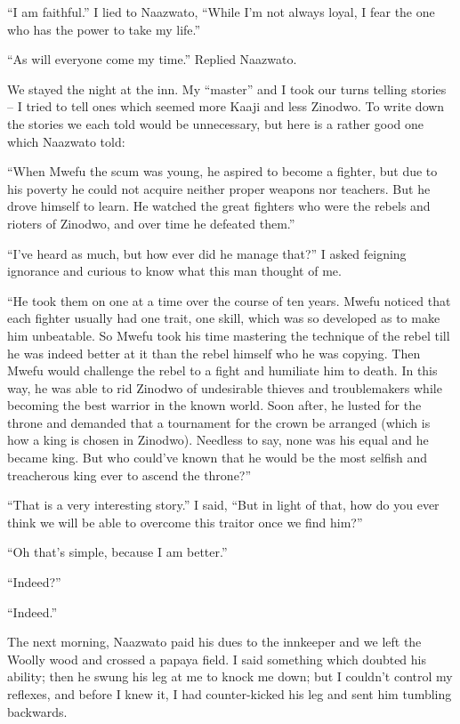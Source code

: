 ``I am faithful.'' I lied to Naazwato, ``While I'm not always loyal, I fear the one who has the power to take my life.''

``As will everyone come my time.'' Replied Naazwato.

We stayed the night at the inn. My ``master'' and I took our turns telling stories -- I tried to tell ones which seemed more Kaaji and less Zinodwo. To write down the stories we each told would be unnecessary, but here is a rather good one which Naazwato told:

``When Mwefu the scum was young, he aspired to become a fighter, but due to his poverty he could not acquire neither proper weapons nor teachers. But he drove himself to learn. He watched the great fighters who were the rebels and rioters of Zinodwo, and over time he defeated them.''

``I've heard as much, but how ever did he manage that?'' I asked feigning ignorance and curious to know what this man thought of me.

``He took them on one at a time over the course of ten years. Mwefu noticed that each fighter usually had one trait, one skill, which was so developed as to make him unbeatable. So Mwefu took his time mastering the technique of the rebel till he was indeed better at it than the rebel himself who he was copying.
Then Mwefu would challenge the rebel to a fight and humiliate him to death. In this way, he was able to rid Zinodwo of undesirable thieves and troublemakers while becoming the best warrior in the known world. Soon after, he lusted for the throne and demanded that a tournament for the crown be arranged (which is how a king is chosen in Zinodwo). Needless to say, none was his equal and he became king. But who could've known that he would be the most selfish and treacherous king ever to ascend the throne?''

``That is a very interesting story.'' I said, ``But in light of that, how do you ever think we will be able to overcome this traitor once we find him?''

``Oh that's simple, because I am better.''

``Indeed?''

``Indeed.''

\tbreak

The next morning, Naazwato paid his dues to the innkeeper and we left the Woolly wood and crossed a papaya field. I said something which doubted his ability; then he swung his leg at me to knock me down; but I couldn't control my reflexes, and before I knew it, I had counter-kicked his leg and sent him tumbling backwards.

